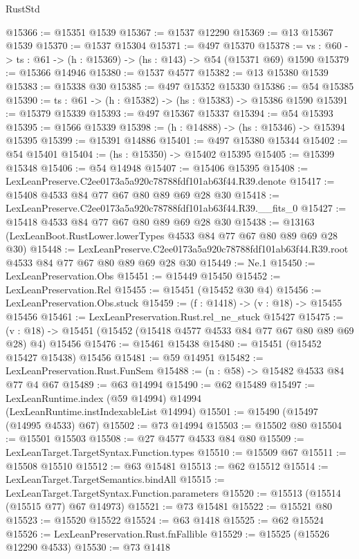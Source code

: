 \begin{lexlean}{RustStd}
\begin{coremodule}
@15366 := @15351 @1539
@15367 := @1537 @12290
@15369 := @13 @15367 @1539
@15370 := @1537 @15304
@15371 := @497 @15370
@15378 := {vs : @60} -> {ts : @61} -> (h : @15369) -> (hs : @143) -> @54 (@15371 @69) @1590
@15379 := @15366 @14946
@15380 := @1537 @4577
@15382 := @13 @15380 @1539
@15383 := @15338 @30
@15385 := @497 @15352 @15330
@15386 := @54 @15385
@15390 := {ts : @61} -> (h : @15382) -> (hs : @15383) -> @15386 @1590
@15391 := @15379 @15339
@15393 := @497 @15367 @15337
@15394 := @54 @15393
@15395 := @1566 @15339
@15398 := (h : @14888) -> (hs : @15346) -> @15394 @15395
@15399 := @15391 @14886
@15401 := @497 @15380 @15344
@15402 := @54 @15401
@15404 := (hs : @15350) -> @15402 @15395
@15405 := @15399 @15348
@15406 := @54 @14948
@15407 := @15406 @15395
@15408 := LexLeanPreserve.C2ee0173a5a920c78788fdf101ab63f44.R39.denote
@15417 := @15408 @4533 @84 @77 @67 @80 @89 @69 @28 @30
@15418 := LexLeanPreserve.C2ee0173a5a920c78788fdf101ab63f44.R39.__fits_0
@15427 := @15418 @4533 @84 @77 @67 @80 @89 @69 @28 @30
@15438 := @13163 (LexLeanBoot.RustLower.lowerTypes @4533 @84 @77 @67 @80 @89 @69 @28 @30)
@15448 := LexLeanPreserve.C2ee0173a5a920c78788fdf101ab63f44.R39.root
    @4533
    @84
    @77
    @67
    @80
    @89
    @69
    @28
    @30
@15449 := Ne.{1}
@15450 := LexLeanPreservation.Obs
@15451 := @15449 @15450
@15452 := LexLeanPreservation.Rel
@15455 := @15451 (@15452 @30 @4)
@15456 := LexLeanPreservation.Obs.stuck
@15459 := (f : @1418) -> (v : @18) -> @15455 @15456
@15461 := LexLeanPreservation.Rust.rel_ne_stuck @15427
@15475 := (v : @18) -> @15451 (@15452 (@15418 @4577 @4533 @84 @77 @67 @80 @89 @69 @28) @4) @15456
@15476 := @15461 @15438
@15480 := @15451 (@15452 @15427 @15438) @15456
@15481 := @59 @14951
@15482 := LexLeanPreservation.Rust.FunSem
@15488 := (n : @58) -> @15482 @4533 @84 @77 @4 @67
@15489 := @63 @14994
@15490 := @62 @15489
@15497 := LexLeanRuntime.index (@59 @14994) @14994 (LexLeanRuntime.instIndexableList @14994)
@15501 := @15490 (@15497 (@14995 @4533) @67)
@15502 := @73 @14994
@15503 := @15502 @80
@15504 := @15501 @15503
@15508 := @27 @4577 @4533 @84 @80
@15509 := LexLeanTarget.TargetSyntax.Function.types
@15510 := @15509 @67
@15511 := @15508 @15510
@15512 := @63 @15481
@15513 := @62 @15512
@15514 := LexLeanTarget.TargetSemantics.bindAll
@15515 := LexLeanTarget.TargetSyntax.Function.parameters
@15520 := @15513 (@15514 (@15515 @77) @67 @14973)
@15521 := @73 @15481
@15522 := @15521 @80
@15523 := @15520 @15522
@15524 := @63 @1418
@15525 := @62 @15524
@15526 := LexLeanPreservation.Rust.fnFallible
@15529 := @15525 (@15526 @12290 @4533)
@15530 := @73 @1418

\end{coremodule}
\end{lexlean}
